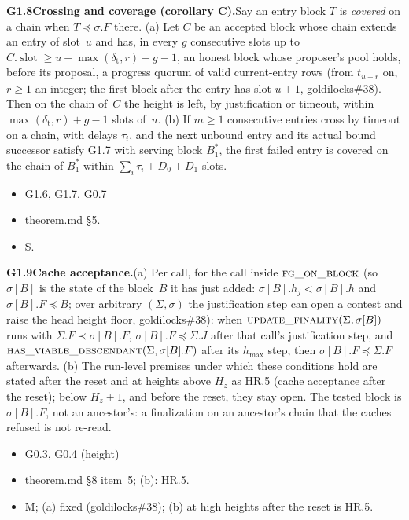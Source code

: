 \documentclass{article}
\newcommand{\slot}{\operatorname{slot}}
\newcommand{\hmax}{h_{\max}}
\newcommand{\fname}[1]{\text{\textsc{#1}}}
\newcommand{\dagnode}[6]{%
\par\medskip\noindent\textbf{#1\enspace #2.}\enspace #3
\begin{itemize}[leftmargin=2.2em,itemsep=0pt,topsep=2pt]
\item[\emph{Uses}] #4
\item[\emph{Evid.}] #5
\item[\emph{Task}] #6
\end{itemize}}
\begin{document}
\dagnode{G1.8}{Crossing and coverage (corollary C)}{Say an entry block $T$
is \emph{covered} on a chain when $T\preceq\sigma.F$ there.  (a) Let $C$ be an
accepted block whose chain extends an entry of slot~$u$ and has, in every $g$
consecutive slots up to $C.\slot\geq u+\max(\delta_{\mathrm t},r)+g-1$, an
honest block whose proposer's pool holds, before its proposal, a progress
quorum of valid current-entry rows (from $t_{u+r}$ on, $r\geq1$ an integer;
the first block after the entry has slot $u+1$, goldilocks\#38).  Then
on the chain of~$C$ the height is left, by justification or timeout, within
$\max(\delta_{\mathrm t},r)+g-1$ slots of~$u$.  (b) If $m\geq1$ consecutive
entries cross by timeout on a chain, with delays $\tau_i$, and the next
unbound entry and its actual bound successor satisfy G1.7 with serving block
$B^*_1$, the first failed entry is covered on the chain of $B^*_1$ within
$\sum_i\tau_i+D_0+D_1$ slots.}
{G1.6, G1.7, G0.7}{theorem.md \S5.}{S.}

\dagnode{G1.9}{Cache acceptance}{(a) Per call, for the call inside
$\fname{fg\_on\_block}$ (so $\sigma[B]$ is the state of the block~$B$ it has just
added: $\sigma[B].h_j<\sigma[B].h$ and $\sigma[B].F\preceq B$; over arbitrary
$(\Sigma,\sigma)$ the justification step can open a contest and raise the head
height floor, goldilocks\#38): when
$\fname{update\_finality}(\Sigma,\sigma[B])$ runs with
$\Sigma.F\prec\sigma[B].F$, $\sigma[B].F\preceq\Sigma.J$ after that call's
justification step, and $\fname{has\_viable\_descendant}(\Sigma,\sigma[B].F)$
after its $\hmax$ step, then $\sigma[B].F\preceq\Sigma.F$ afterwards.  (b) The
run-level premises under which these conditions hold are stated after the reset
and at heights above $H_z$ as HR.5 (cache acceptance after the reset); below
$H_z+1$, and before the reset, they stay open.  The tested block is $\sigma[B].F$, not an ancestor's:
a finalization on an ancestor's chain that the caches refused is not re-read.}
{G0.3, G0.4 (height)}{theorem.md \S8 item~5; (b): HR.5.}{M; (a) fixed (goldilocks\#38); (b)
at high heights after the reset is HR.5.}
\end{document}
